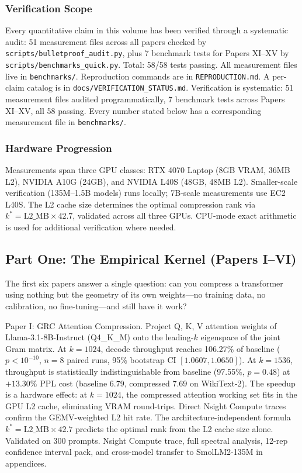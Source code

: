 \documentclass[11pt]{article}
\begin{document}
\subsubsection*{Verification Scope}
Every quantitative claim in this volume has been verified through a systematic audit: 51 measurement files across all papers checked by \texttt{scripts/bulletproof\_audit.py}, plus 7 benchmark tests for Papers XI--XV by \texttt{scripts/benchmarks\_quick.py}. Total: 58/58 tests passing. All measurement files live in \texttt{benchmarks/}. Reproduction commands are in \texttt{REPRODUCTION.md}. A per-claim catalog is in \texttt{docs/VERIFICATION\_STATUS.md}. Verification is systematic: 51 measurement files audited programmatically, 7 benchmark tests across Papers XI--XV, all 58 passing. Every number stated below has a corresponding measurement file in \texttt{benchmarks/}.

\subsubsection*{Hardware Progression}
Measurements span three GPU classes: RTX 4070 Laptop (8GB VRAM, 36MB L2), NVIDIA A10G (24GB), and NVIDIA L40S (48GB, 48MB L2). Smaller-scale verification (135M--1.5B models) runs locally; 7B-scale measurements use EC2 L40S. The L2 cache size determines the optimal compression rank via $k^* = \mathrm{L2\_MB} \times 42.7$, validated across all three GPUs. CPU-mode exact arithmetic is used for additional verification where needed.

\subsection*{Part One: The Empirical Kernel (Papers I--VI)}

The first six papers answer a single question: can you compress a transformer using nothing but the geometry of its own weights---no training data, no calibration, no fine-tuning---and still have it work?

Paper I: GRC Attention Compression. Project Q, K, V attention weights of Llama-3.1-8B-Instruct (Q4\_K\_M) onto the leading-$k$ eigenspace of the joint Gram matrix. At $k=1024$, decode throughput reaches 106.27\% of baseline ($p < 10^{-10}$, $n=8$ paired runs, 95\% bootstrap CI $[1.0607, 1.0650]$). At $k=1536$, throughput is statistically indistinguishable from baseline (97.55\%, $p=0.48$) at $+13.30\%$ PPL cost (baseline 6.79, compressed 7.69 on WikiText-2). The speedup is a hardware effect: at $k=1024$, the compressed attention working set fits in the GPU L2 cache, eliminating VRAM round-trips. Direct Nsight Compute traces confirm the GEMV-weighted L2 hit rate. The architecture-independent formula $k^* = \mathrm{L2\_MB} \times 42.7$ predicts the optimal rank from the L2 cache size alone. Validated on 300 prompts. Nsight Compute trace, full spectral analysis, 12-rep confidence interval pack, and cross-model transfer to SmolLM2-135M in appendices.
\end{document}
